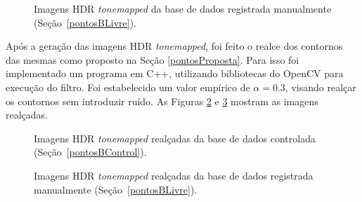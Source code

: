 \begin{figure}[H]
  \centering 
  \quad %
  \quad %
  \quad %
  \caption{Imagens HDR \textit{tonemapped} da base de dados registrada manualmente (Seção~\protect\ref{pontosBLivre}).}
  \label{figRes2Tonemap}
\end{figure}

Após a geração das imagens HDR \textit{tonemapped}, foi feito o realce dos contornos das mesmas como proposto na Seção \ref{pontosProposta}. Para isso foi implementado um programa em C++, utilizando bibliotecas do OpenCV para execução do filtro. Foi estabelecido um valor empírico de $\alpha = 0.3$, visando realçar os contornos sem introduzir ruído. As Figuras \ref{figResRealce} e \ref{figRes2Realce} mostram as imagens realçadas.

\begin{figure}[H]
  \centering 
  \quad %
  \quad %
  \quad %
  \caption{Imagens HDR \textit{tonemapped} realçadas da base de dados controlada (Seção~\protect\ref{pontosBControl}).}
  \label{figResRealce}
\end{figure}

\begin{figure}[H]
  \centering 
  \quad %
  \quad %
  \quad %
  \caption{Imagens HDR \textit{tonemapped} realçadas da base de dados registrada manualmente (Seção~\protect\ref{pontosBLivre}).}
  \label{figRes2Realce}
\end{figure}


